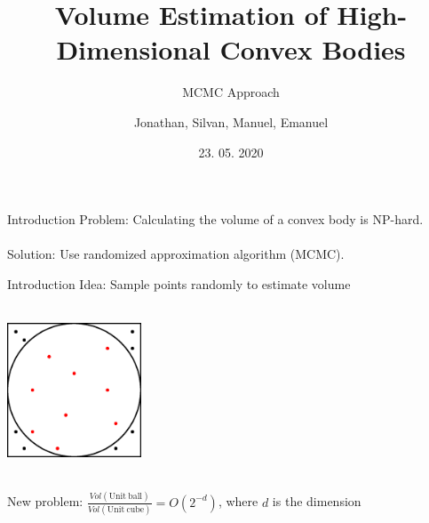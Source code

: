 \documentclass[table]{beamer}
\title{Volume Estimation of High-Dimensional Convex Bodies}
\subtitle{MCMC Approach}
\author{Jonathan, Silvan, Manuel, Emanuel}
\date{23. 05. 2020}
\begin{document}

\begin{frame}
	\maketitle %
\end{frame}






\begin{frame}{Introduction}
    Problem: Calculating the volume of a convex body is NP-hard.\\
    \ \\
    Solution: Use randomized approximation algorithm (MCMC).
\end{frame}

\begin{frame}{Introduction}
    Idea: Sample points randomly to estimate volume\\
    \ \\
    \begin{center}
        \includegraphics[width=40mm]{basic_sampling.eps}
    \end{center}
    \ \\
    New problem: $\frac{Vol(\mathrm{Unit\ ball})}{Vol(\mathrm{Unit\ cube})} = O(2^{-d})$, where $d$ is the dimension
\end{frame}
\end{document}
